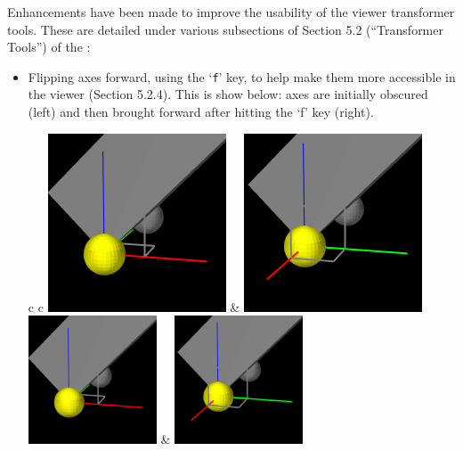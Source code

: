 \documentclass{article}
\begin{document}
Enhancements have been made to improve the usability of the viewer
transformer tools. These are detailed under various subsections of
Section 5.2 (``Transformer Tools'') of the
:

\begin{itemize}

\item Flipping axes forward, using the `{\tt f}' key, to help
make them more accessible in the viewer (Section 5.2.4). This
is show below: axes are initially obscured (left) and then brought
forward after hitting the `f' key (right).

\begin{center}
\begin{tabular}{c c}
\iflatexml
\includegraphics[]{../uiguide/images/transformerUnflipped} &
\includegraphics[]{../uiguide/images/transformerFlipped}
\else
\includegraphics[width=0.3\textwidth]{../uiguide/images/transformerUnflipped} &
\includegraphics[width=0.3\textwidth]{../uiguide/images/transformerFlipped}
\fi
\end{tabular}
\end{center}


\end{itemize}
\end{document}
